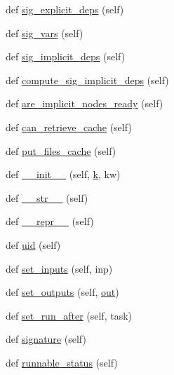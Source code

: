\begin{DoxyCompactItemize}
\item 
def \hyperlink{classwaflib_1_1_task_1_1_task_a76a53025fb59fd6096f988ff64481070}{sig\+\_\+explicit\+\_\+deps} (self)
\item 
def \hyperlink{classwaflib_1_1_task_1_1_task_acffd01af005b390787b85239ac207282}{sig\+\_\+vars} (self)
\item 
def \hyperlink{classwaflib_1_1_task_1_1_task_a60ce159ef323481b09fcea4decb9e231}{sig\+\_\+implicit\+\_\+deps} (self)
\item 
def \hyperlink{classwaflib_1_1_task_1_1_task_adf3f63ea77fbca592ebc4244ba57887d}{compute\+\_\+sig\+\_\+implicit\+\_\+deps} (self)
\item 
def \hyperlink{classwaflib_1_1_task_1_1_task_a89612661d2073f53f62d7306a6c2238d}{are\+\_\+implicit\+\_\+nodes\+\_\+ready} (self)
\item 
def \hyperlink{classwaflib_1_1_task_1_1_task_a2085cfed25d49bed519af381621b29e7}{can\+\_\+retrieve\+\_\+cache} (self)
\item 
def \hyperlink{classwaflib_1_1_task_1_1_task_adf5e108580503738b2ab58eb1b56c10f}{put\+\_\+files\+\_\+cache} (self)
\item 
def \hyperlink{classwaflib_1_1_task_1_1_task_a566ab609bec4499aeab7bcd6f77f156e}{\+\_\+\+\_\+init\+\_\+\+\_\+} (self, \hyperlink{rfft2d_test_m_l_8m_adc468c70fb574ebd07287b38d0d0676d}{k}, kw)
\item 
def \hyperlink{classwaflib_1_1_task_1_1_task_a2507ae71718d699910a9dd8708664630}{\+\_\+\+\_\+str\+\_\+\+\_\+} (self)
\item 
def \hyperlink{classwaflib_1_1_task_1_1_task_ac05a045661750df307593224089759da}{\+\_\+\+\_\+repr\+\_\+\+\_\+} (self)
\item 
def \hyperlink{classwaflib_1_1_task_1_1_task_a910c51ea67c1c47ac40690bbba73b76a}{uid} (self)
\item 
def \hyperlink{classwaflib_1_1_task_1_1_task_a647c971bbca84d07daeff8d24f70ea18}{set\+\_\+inputs} (self, inp)
\item 
def \hyperlink{classwaflib_1_1_task_1_1_task_a8e650ed64c8370720574ebd8481a4f48}{set\+\_\+outputs} (self, \hyperlink{latency_8c_a71fd1c281affec034757279e4f91c50b}{out})
\item 
def \hyperlink{classwaflib_1_1_task_1_1_task_a84292828c5a6cf3282027ed8ce5c7822}{set\+\_\+run\+\_\+after} (self, task)
\item 
def \hyperlink{classwaflib_1_1_task_1_1_task_a48e55f13de8172b779a4e63794c7f44f}{signature} (self)
\item 
def \hyperlink{classwaflib_1_1_task_1_1_task_a2a281aaea77a0732f72103cfe4bc56c4}{runnable\+\_\+status} (self)

\end{DoxyCompactItemize}
